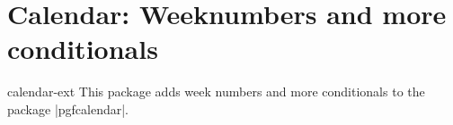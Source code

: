 %
%
%

\section{Calendar: Weeknumbers and more conditionals}
\label{sec:calendar}
\begin{texpackage}{calendar-ext}
  This package adds week numbers and more conditionals to the \pgfname\space package |pgfcalendar|.
\end{texpackage}


